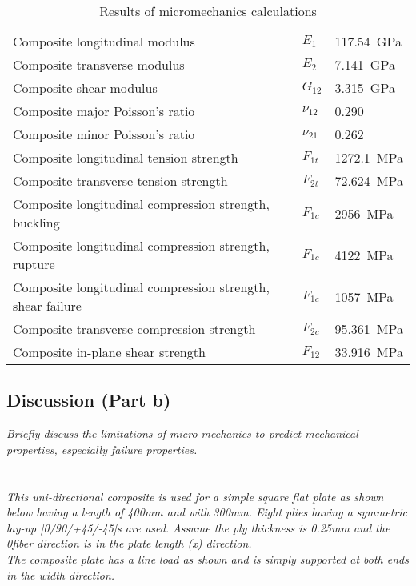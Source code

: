 \documentclass[a4paper,twosided,12pt,DIV12]{scrartcl}
\begin{document}
\begin{table}[htbp]
  \centering
  \begin{tabular}{lll}
    \toprule
    Composite longitudinal modulus & $E_1$ & \SI{117.54}{GPa}\\
    Composite transverse modulus & $E_2$ & \SI{7.141}{GPa}\\
    Composite shear modulus & $G_{12}$ & \SI{3.315}{GPa}\\
    Composite major Poisson's ratio &$\nu_{12}$ & \num{0.290}\\
    Composite minor Poisson's ratio &$\nu_{21}$ & \num{0.262}\\
    Composite longitudinal tension strength & $F_{1t}$ & \SI{1272.1}{MPa}\\
    Composite transverse tension strength & $F_{2t}$ & \SI{72.624}{MPa}\\
    Composite longitudinal compression strength, buckling & $F_{1c}$ & \SI{2956}{MPa}\\
    Composite longitudinal compression strength, rupture  & $F_{1c}$ & \SI{4122}{MPa}\\
    Composite longitudinal compression strength, shear failure & $F_{1c}$ & \SI{1057}{MPa}\\
    Composite transverse compression strength & $F_{2c}$ & \SI{95.361}{MPa}\\
    Composite in-plane shear strength & $F_{12}$ & \SI{33.916}{MPa}\\
    \bottomrule
  \end{tabular}
  \caption{Results of micromechanics calculations}
\end{table}

\subsection{Discussion (Part b)}

\textit{Briefly discuss the limitations of micro-mechanics to predict mechanical
properties, especially failure properties.}

\section{}
\textit{This uni-directional composite is used for a simple square flat plate as shown
below having a length of 400mm and with 300mm. Eight plies having a symmetric
lay-up [0/90/+45/-45]s are used. Assume the ply thickness is 0.25mm and the
0\degree fiber direction is in the plate length (x) direction.
\\The composite plate has a line load as shown and is simply supported at both
ends in the width direction.}
\end{document}
